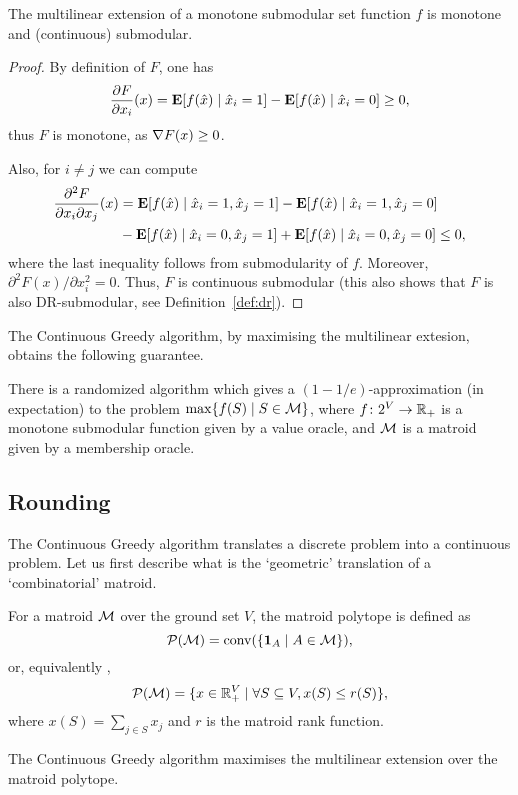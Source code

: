 \begin{lemma}\label{lem:multiproperties}
    The multilinear extension of a monotone submodular set function $f$ is monotone and (continuous) submodular.
\end{lemma}
\begin{proof}
    By definition of $F$, one has
    \[
        \frac{\partial F}{\partial x_i}(x) = \mathbf{E}[f(\hat{x})\mid \hat{x}_i = 1] - \mathbf{E}[f(\hat{x})\mid \hat{x}_i = 0] \geq 0,
    \]
    thus $F$ is monotone, as $\nabla F(x) \geq 0$.

    Also, for $i\neq j$ we can compute
    \begin{align*}
        \frac{\partial^2 F}{\partial x_i\partial x_j}(x) &= \mathbf{E}[f(\hat{x})\mid \hat{x}_i = 1, \hat{x}_j = 1] - \mathbf{E}[f(\hat{x})\mid \hat{x}_i = 1, \hat{x}_j = 0] \\
                                                         &- \mathbf{E}[f(\hat{x})\mid \hat{x}_i = 0, \hat{x}_j = 1] + \mathbf{E}[f(\hat{x})\mid \hat{x}_i = 0, \hat{x}_j = 0] 
                                                         \leq 0,
    \end{align*}
    where the last inequality follows from submodularity of $f$. Moreover, $\partial^2 F(x)/\partial x_i^2 = 0$. Thus, $F$ is continuous submodular (this also shows that $F$ is also DR-submodular, see Definition~\ref{def:dr}).
\end{proof}

The Continuous Greedy algorithm, by maximising the multilinear extesion, obtains the following guarantee.
\begin{theorem}
    There is a randomized algorithm which gives a $(1-1/e)$-approximation (in expectation) to the problem $\max\{f(S) \mid S \in \mathcal{M}\}$, where $f\colon 2^V \to \mathbb{R}_+$ is a monotone submodular function given by a value oracle, and $\mathcal{M}$ is a matroid given by a membership oracle.
\end{theorem}

\subsection{Rounding}\label{sec:rounding}
The Continuous Greedy algorithm translates a discrete problem into a continuous problem. Let us first describe what is the `geometric' translation of a `combinatorial' matroid. 

\begin{definition}
    For a matroid $\mathcal{M}$ over the ground set $V$, the matroid polytope is defined as 
    \[
        \mathcal{P}(\mathcal{M}) = \mathrm{conv}(\{\mathbf{1}_A \mid A \in \mathcal{M} \}),
    \]
    or, equivalently \citep{edmonds2003submodular},
    \[
        \mathcal{P}(\mathcal{M}) = \{ x\in \mathbb{R}^{V}_+ \mid \forall S\subseteq V, x(S) \leq r(S) \},
    \]
    where $x(S) = \sum_{j\in S}x_j$ and $r$ is the matroid rank function.
\end{definition}
The Continuous Greedy algorithm maximises the multilinear extension over the matroid polytope.

